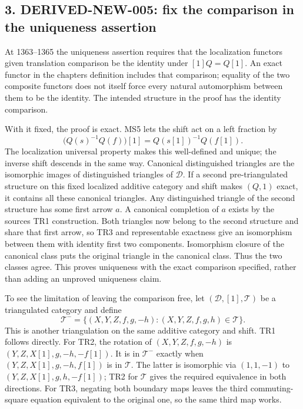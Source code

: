 \documentclass[11pt]{article}
\begin{document}
\subsection{\texorpdfstring{3. DERIVED-NEW-005:\allowbreak{} fix the comparison in the uniqueness assertion}{3.  fix the comparison in the uniqueness assertion}}\label{proofs-1149-1843-derived-new-005-fix-the-comparison-in-the-uniqueness-assertion}

At 1363–\allowbreak{}1365 the uniqueness assertion requires that the localization functor\textquotesingle s given translation comparison be the identity under \([1]Q=Q[1]\). An exact functor in the chapter\textquotesingle s definition includes that comparison; equality of the two composite functors does not itself force every natural automorphism between them to be the identity. The intended structure in the proof has the identity comparison.

With it fixed,\allowbreak{} the proof is exact. MS5 lets the shift act on a left fraction by \[
\bigl(Q(s)^{-1}Q(f)\bigr)[1]=Q(s[1])^{-1}Q(f[1]).
\] The localization universal property makes this well-defined and unique; the inverse shift descends in the same way. Canonical distinguished triangles are the isomorphic images of distinguished triangles of \(\mathcal D\). If a second pre-triangulated structure on this fixed localized additive category and shift makes \((Q,1)\) exact,\allowbreak{} it contains all these canonical triangles. Any distinguished triangle of the second structure has some first arrow \(a\). A canonical completion of \(a\) exists by the source\textquotesingle s TR1 construction. Both triangles now belong to the second structure and share that first arrow,\allowbreak{} so TR3 and representable exactness give an isomorphism between them with identity first two components. Isomorphism closure of the canonical class puts the original triangle in the canonical class. Thus the two classes agree. This proves uniqueness with the exact comparison specified,\allowbreak{} rather than adding an unproved uniqueness claim.

To see the limitation of leaving the comparison free,\allowbreak{} let \((\mathcal D,[1],\mathcal T)\) be a triangulated category and define \[
\mathcal T^-=
\{(X,Y,Z,f,g,-h):(X,Y,Z,f,g,h)\in\mathcal T\}.
\] This is another triangulation on the same additive category and shift. TR1 follows directly. For TR2,\allowbreak{} the rotation of \((X,Y,Z,f,g,-h)\) is \((Y,Z,X[1],g,-h,-f[1])\). It is in \(\mathcal T^-\) exactly when \((Y,Z,X[1],g,-h,f[1])\) is in \(\mathcal T\). The latter is isomorphic via \((1,1,-1)\) to \((Y,Z,X[1],g,h,-f[1])\); TR2 for \(\mathcal T\) gives the required equivalence in both directions. For TR3,\allowbreak{} negating both boundary maps leaves the third commuting-square equation equivalent to the original one,\allowbreak{} so the same third map works.
\end{document}

